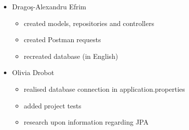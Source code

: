 \documentclass{article}
\begin{document}
\begin{itemize}
    \item Drago\c{s}-Alexandru Efrim
    \begin{itemize}
        \item created models, repositories and controllers
        \item created Postman requests
        \item recreated database (in English)
    \end{itemize}
    \item Olivia Drobot
    \begin{itemize}
        \item realised database connection in application.properties
        \item added project tests
        \item research upon information regarding JPA
    \end{itemize}
\end{itemize}
\end{document}
